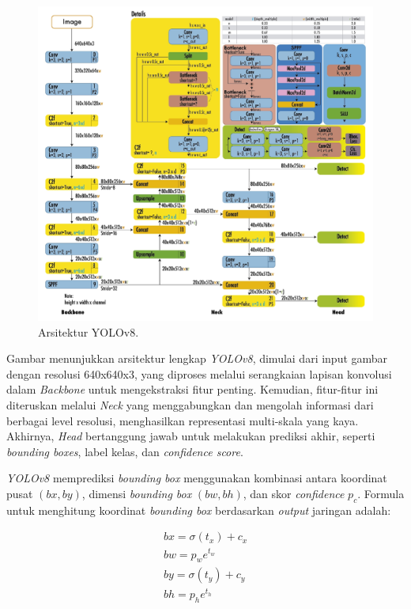 \begin{figure}[H] 
  \centering 
  \includegraphics[scale=0.5]{gambar/YoloV8Architecture.jpg} 
  \caption{Arsitektur YOLOv8.} 
  \label{fig:ArsitekturYOLOv8} 
\end{figure}

Gambar menunjukkan arsitektur lengkap \emph{YOLOv8}, dimulai dari input gambar dengan resolusi 640x640x3, yang diproses melalui serangkaian lapisan konvolusi dalam \emph{Backbone} untuk mengekstraksi fitur penting. Kemudian, fitur-fitur ini diteruskan melalui \emph{Neck} yang menggabungkan dan mengolah informasi dari berbagai level resolusi, menghasilkan representasi multi-skala yang kaya. Akhirnya, \emph{Head} bertanggung jawab untuk melakukan prediksi akhir, seperti \emph{bounding boxes}, label kelas, dan \emph{confidence score}.

\emph{YOLOv8} memprediksi \emph{bounding box} menggunakan kombinasi antara koordinat pusat \((bx, by)\), dimensi \emph{bounding box} \((bw, bh)\), dan skor \emph{confidence} \(p_c\). Formula untuk menghitung koordinat \emph{bounding box} berdasarkan \emph{output} jaringan adalah:

\begin{equation}
  \begin{array}{c}
  bx = \sigma(t_x) + c_x\\
  bw = p_w e^{t_w}\\
  by = \sigma(t_y) + c_y\\ 
  bh = p_h e^{t_h}
  \end{array}
\end{equation}


